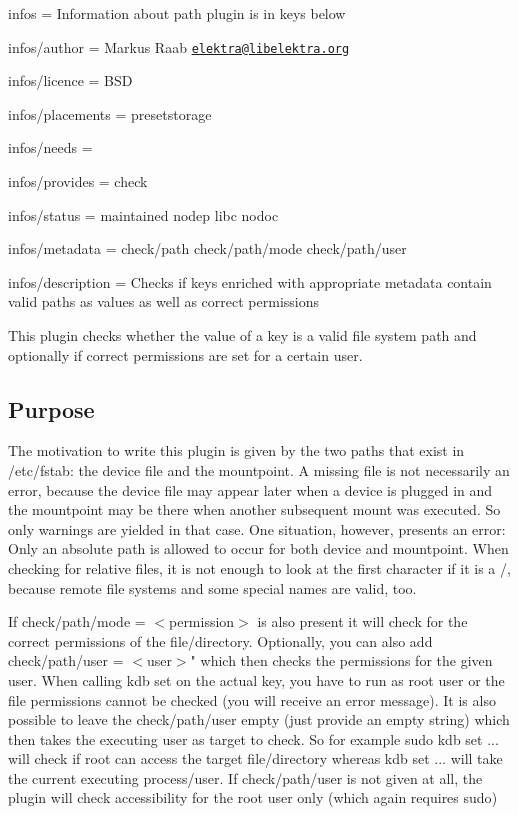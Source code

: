 
\begin{DoxyItemize}
\item infos = Information about path plugin is in keys below
\item infos/author = Markus Raab \href{mailto:elektra@libelektra.org}{\tt elektra@libelektra.\+org}
\item infos/licence = B\+SD
\item infos/placements = presetstorage
\item infos/needs =
\item infos/provides = check
\item infos/status = maintained nodep libc nodoc
\item infos/metadata = check/path check/path/mode check/path/user
\item infos/description = Checks if keys enriched with appropriate metadata contain valid paths as values as well as correct permissions
\end{DoxyItemize}

This plugin checks whether the value of a key is a valid file system path and optionally if correct permissions are set for a certain user.

\subsection*{Purpose}

The motivation to write this plugin is given by the two paths that exist in /etc/fstab\+: the device file and the mountpoint. A missing file is not necessarily an error, because the device file may appear later when a device is plugged in and the mountpoint may be there when another subsequent mount was executed. So only warnings are yielded in that case. One situation, however, presents an error\+: Only an absolute path is allowed to occur for both device and mountpoint. When checking for relative files, it is not enough to look at the first character if it is a {\ttfamily /}, because remote file systems and some special names are valid, too.

If {\ttfamily check/path/mode = $<$permission$>$} is also present it will check for the correct permissions of the file/directory. Optionally, you can also add {\ttfamily check/path/user = $<$user$>$"} which then checks the permissions for the given user. When calling {\ttfamily kdb set} on the actual key, you have to run as {\ttfamily root} user or the file permissions cannot be checked (you will receive an error message). It is also possible to leave the {\ttfamily check/path/user} empty (just provide an empty string) which then takes the executing user as target to check. So for example {\ttfamily sudo kdb set ...} will check if {\ttfamily root} can access the target file/directory whereas {\ttfamily kdb set ...} will take the current executing process/user. If {\ttfamily check/path/user} is not given at all, the plugin will check accessibility for the {\ttfamily root} user only (which again requires {\ttfamily sudo})

